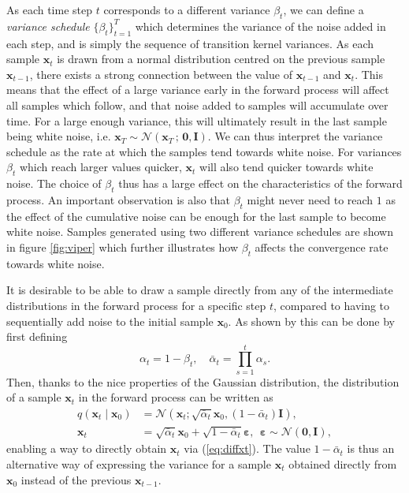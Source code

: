 \documentclass{report}
\begin{document}
As each time step $t$ corresponds to a different variance $\beta_t$, we can define a \textit{variance schedule} $\{\beta_t\}_{t=1}^T$ which determines the variance of the noise added in each step, and is simply the sequence of transition kernel variances. As each sample $\bm{x}_t$ is drawn from a normal distribution centred on the previous sample $\bm{x}_{t-1}$, there exists a strong connection between the value of $\bm{x}_{t-1}$ and $\bm{x}_t$. This means that the effect of a large variance early in the forward process will affect all samples which follow, and that noise added to samples will accumulate over time. For a large enough variance, this will ultimately result in the last sample being white noise, i.e. $\bm{x}_T \sim \mathcal{N}(\bm{x}_T \, ; \, \bm{0}, \bm{I})$. We can thus interpret the variance schedule as the rate at which the samples tend towards white noise. For variances $\beta_t$ which reach larger values quicker, $\bm{x}_t$ will also tend quicker towards white noise. The choice of $\beta_t$ thus has a large effect on the characteristics of the forward process. An important observation is also that $\beta_t$ might never need to reach $1$ as the effect of the cumulative noise can be enough for the last sample to become white noise. Samples generated using two different variance schedules are shown in figure \ref{fig:viper} which further illustrates how $\beta_t$ affects the convergence rate towards white noise.

It is desirable to be able to draw a sample directly from any of the intermediate  distributions in the forward process for a specific step $t$, compared to having to sequentially add noise to the initial sample $\bm{x}_0$. As shown by \cite{ho2020denoising} this can be done by first defining 
\begin{equation} \label{eq:abar}
    \alpha_t = 1 - \beta_t, \quad \bar{\alpha}_t = \prod_{s=1}^t \alpha_s.
\end{equation}
Then, thanks to the nice properties of the Gaussian distribution, the distribution of a sample $\bm{x}_t$ in the forward process can be written as
\begin{align}
    q(\bm{x}_t \mid \bm{x}_0) &= \mathcal{N} \left( \bm{x}_t ; \sqrt{\bar{\alpha}_t} \bm{x}_0, (1 - \bar{\alpha}_t) \bm{I} \right), \\
    \bm{x}_t &= \sqrt{\bar{\alpha}_t} \bm{x}_0 + \sqrt{1 - \bar{\alpha}_t} \bm{\varepsilon}, \ \ \bm{\varepsilon} \sim \mathcal{N}(\bm{0}, \bm{I}),
    \label{eq:diffxt}
\end{align}
enabling a way to directly obtain $\bm{x}_t$ via (\ref{eq:diffxt}). The value $1-\bar{\alpha}_t$ is thus an alternative way of expressing the variance for a sample $\bm{x}_t$ obtained directly from $\bm{x}_0$ instead of the previous $\bm{x}_{t-1}$.
\end{document}
